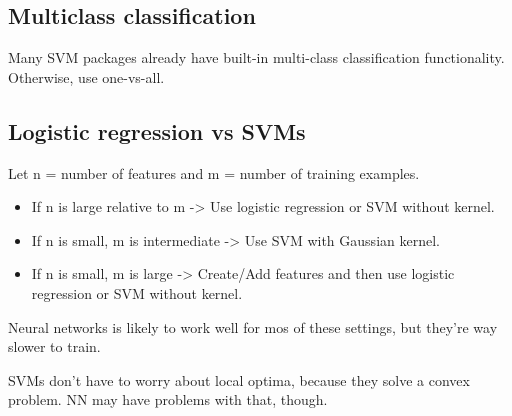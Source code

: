 \documentclass[10pt]{extarticle}
\begin{document}
\subsection{Multiclass classification}\label{multiclass-classification}

Many SVM packages already have built-in multi-class classification
functionality. Otherwise, use one-vs-all.

\subsection{Logistic regression vs
SVMs}\label{logistic-regression-vs-svms}

Let n = number of features and m = number of training examples.
\smallskip

\begin{itemize}
\itemsep1pt\parskip0pt
\item
  If n is large relative to m -\textgreater{} Use logistic regression or
  SVM without kernel.
\item
  If n is small, m is intermediate -\textgreater{} Use SVM with Gaussian
  kernel.
\item
  If n is small, m is large -\textgreater{} Create/Add features and then
  use logistic regression or SVM without kernel.
\end{itemize}

Neural networks is likely to work well for mos of these settings, but
they're way slower to train.

SVMs don't have to worry about local optima, because they solve a convex
problem. NN may have problems with that, though.




    \nocite{*}



\end{document}
